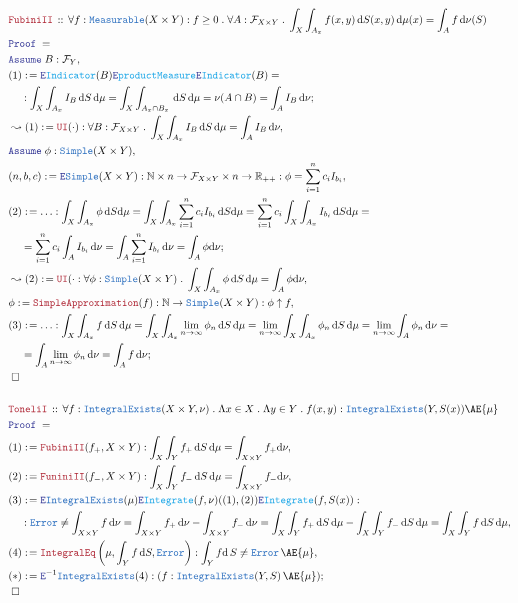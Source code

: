 \documentclass[12pt]{scrartcl}
\newcommand{\TYPE}[1]{\textcolor{NavyBlue}{\mathtt{#1}}}
\newcommand{\FUNC}[1]{\textcolor{Cerulean}{\mathtt{#1}}}
\newcommand{\LOGIC}[1]{\textcolor{Blue}{\mathtt{#1}}}
\newcommand{\THM}[1]{\textcolor{Maroon}{\mathtt{#1}}}
\renewcommand{\.}{\; . \;}
\newcommand{\de}{: \kern 0.1pc =}
\newcommand{\Theorem}[2]{& \THM{#1} \, :: \, #2 \\ & \Proof = \\ }
\newcommand{\NewLine}{\\ & \kern 1pc}
\newcommand{\Page}[1]{ \begin{align*} #1 \end{align*}   }
\newcommand{\ForEach}[3]{\forall #1 : #2 \. #3 }
\newcommand{\Reals}{\mathbb{R} }
\newcommand{\Nat}{\mathbb{N} }
\newcommand{\Say}[3]{& #1 \de #2 : #3, \\}
\newcommand{\Conclude}[3]{& #1 \de #2 : #3; \\}
\newcommand{\Derive}[3]{& \leadsto #1 \de #2 : #3, \\}
\newcommand{\Assume}[2]{& \LOGIC{Assume} \; #1 : #2, \\}
\newcommand{\ByDef}{\LOGIC{E}}
\newcommand{\QED}{\; \square}
\newcommand{\EndProof}{& \QED \\}
\newcommand{\Proof}{\LOGIC{Proof} \; }
\newcommand{\F}{\mathcal{F}}
\begin{document}
\Page{
\Theorem{FubiniII}{
\ForEach{f}{\TYPE{Measurable}(X \times Y) : f \ge 0  }{
\ForEach{A}{\F_{X \times Y }}{\int_X \int_{A_x} f(x,y) \, \mathrm{d} S(x,y) \, \mathrm{d} \mu(x) = \int_A f \, \mathrm{d} \nu(S)}}}
\Assume{B}{\F_Y}
\Conclude{(1)}{\ByDef\FUNC{Indicator}(B)\ByDef\FUNC{productMeasure}\ByDef\FUNC{Indicator}(B) = \NewLine}
{ \int_X \int_{A_x} I_B \, \mathrm{d} S \, \mathrm{d} \mu = \int_X \int_{A_x \cap B_x} \, \mathrm{d}S \, \mathrm{d}\mu = \nu(A \cap B) = \int_A I_B \, \mathrm{d} \nu }
\Derive{(1)}{\THM{UI}(\cdot)}{ \ForEach{B}{\F_{X \times Y}}{ \int_X \int_{A_x} I_B \, \mathrm{d} S  \, \mathrm{d}\mu = \int_{A} I_B  \, \mathrm{d} \nu  }}
\Assume{\phi}{\TYPE{Simple}(X \times Y)}
\Say{(n,b,c)}{\ByDef \TYPE{Simple}(X \times Y)}{ \Nat \times n \to \F_{X \times Y} \times n \to \Reals_{++} : \phi = \sum^n_{i=1}c_iI_{b_i} }
\Conclude{(2)}{\ldots}{ \int_X \int_{A_x} \phi \, \mathrm{d} S \mathrm{d} \mu 
= \int_{X} \int_{A_x} \sum^n_{i=1}c_i I_{b_i} \, \mathrm{d} S \mathrm{d} \mu
=  \sum^n_{i = 1} c_i \int_X \int_{A_x}  I_{b_i} \, \mathrm{d} S \mathrm{d} \mu = \NewLine
=  \sum^n_{i = 1} c_i \int_A I_{b_i} \, \mathrm{ d } \nu
= \int_A \sum^n_{i = 1} I_{b_i} \, \mathrm{ d } \nu
= \int_A \phi \mathrm{ d } \nu
 }
\Derive{(2)}{\THM{UI}(\cdot}{ \ForEach{\phi}{\TYPE{Simple}(X \times Y)}{ \int_X \int_{A_x} \phi \, \mathrm{d} S \, \mathrm{d} \mu = \int_A \phi \mathrm{ d } \nu } }
\Say{\phi}{\THM{SimpleApproximation}(f)}{ \Nat \to \TYPE{Simple}(X \times Y) : \phi \uparrow f }
\Conclude{ (3)}{\ldots}{
\int_X \int_{A_x} f \,  \mathrm{d} S \, \mathrm{d} \mu  
= \int_X \int_{A_x} \lim_{n \to \infty} \phi_n \, \mathrm{d} S \, \mathrm{d} \mu
= \lim_{n \to \infty} \int_X \int_{A_x} \phi_n \, \mathrm{d} S \, \mathrm{d} \mu
= \lim_{n \to \infty} \int_A \phi_n \, \mathrm{d} \nu = \NewLine
= \int_{A} \lim_{n \to \infty} \phi_n \, \mathrm{d} \nu
= \int_{A} f \, \mathrm{d} \nu
}
\EndProof
\\
\Theorem{ToneliI}{
\ForEach{f}{\TYPE{IntegralExists}(X \times Y, \nu)}{
 \Lambda x \in X \.  \Lambda y \in Y \. f(x,y) : \TYPE{IntegralExists}(Y,S(x)) \AE{\mu}
}}
\Say{(1)}{ \THM{FubiniII}(f_+,X \times Y) }
{ \int_X \int_Y f_+ \, \mathrm{d} S \, \mathrm{d}\mu 
 = \int_{X \times Y} f_+ \mathrm{d}{\nu}  
 }
\Say{(2)}{ \THM{FuniniII}(f_-,X \times Y)}
{
 \int_X \int_Y f_- \, \mathrm{d} S \, \mathrm{d} \mu
 = \int_{X \times Y} f_- \mathrm{d}{\nu}
}
\Say{(3)}{ \ByDef\TYPE{IntegralExists}(\mu)\ByDef\FUNC{Integrate}(f,\nu)((1),(2))\ByDef\FUNC{Integrate}(f,S(x))  : \NewLine }
{ \TYPE{Error} \neq \int_{X \times Y} f  \,\mathrm{d} \nu  
 = \int_{X \times Y} f_+ \, \mathrm{d} \nu
  - \int_{X \times Y} f_- \, \mathrm{d} \nu =
 \int_X \int_Y f_+ \, \mathrm{d} S \, \mathrm{d} \mu
 - \int_X \int_Y f_- \, \mathrm{d} S \, \mathrm{d} \mu =
\int_X \int_Y f \, \mathrm{d} S \, \mathrm{d} \mu
}
\Say{(4)}{\THM{IntegralEq}\left( \mu  , \int_Y f \, \mathrm{d} S, \TYPE{Error} \right)}
{ \int_Y f \mathrm{d} \, S  \neq \TYPE{Error}  \, \AE{\mu} }
\Conclude{(*)}{\ByDef^{-1} \TYPE{IntegralExists}(4)}{ ( f : \TYPE{IntegralExists}(Y,S) \, \AE{\mu} ) }
\EndProof
}
\end{document}
